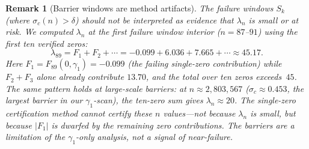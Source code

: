 \documentclass[11pt]{article}
\newtheorem{remark}[theorem]{Remark}
\begin{document}
\begin{remark}[Barrier windows are method artifacts]
\label{rem:barriers_artifact}
The failure windows $S_k$ (where $\sigma_c(n) > \delta$) should not be interpreted as
evidence that $\lambda_n$ is small or at risk. We computed $\lambda_n$ at the first failure
window interior ($n = 87$--$91$) using the first ten verified zeros:
\[
  \lambda_{89} = F_1 + F_2 + \cdots = -0.099 + 6.036 + 7.665 + \cdots \approx 45.17.
\]
Here $F_1 = F_{89}(0, \gamma_1) = -0.099$ (the failing single-zero contribution) while
$F_2 + F_3$ alone already contribute $13.70$, and the total over ten zeros exceeds~$45$.
The same pattern holds at large-scale barriers: at $n \approx 2{,}803{,}567$
($\sigma_c \approx 0.453$, the largest barrier in our $\gamma_1$-scan), the ten-zero sum gives
$\lambda_n \approx 20$. The single-zero certification method cannot certify these $n$ values---not
because $\lambda_n$ is small, but because $|F_1|$ is dwarfed by the remaining zero contributions.
The barriers are a limitation of the $\gamma_1$-only analysis, not a signal of near-failure.
\end{remark}
\end{document}
